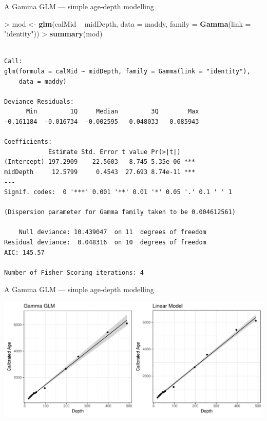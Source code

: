 \documentclass[10pt,ignorenonframetext,compress, aspectratio=169]{beamer}
\newenvironment{Shaded}{\begin{snugshade}}{\end{snugshade}}
\newcommand{\KeywordTok}[1]{\textcolor[rgb]{0.13,0.29,0.53}{\textbf{{#1}}}}
\newcommand{\DataTypeTok}[1]{\textcolor[rgb]{0.13,0.29,0.53}{{#1}}}
\newcommand{\StringTok}[1]{\textcolor[rgb]{0.31,0.60,0.02}{{#1}}}
\newcommand{\NormalTok}[1]{{#1}}
\begin{document}
\begin{frame}[fragile]{A Gamma GLM --- simple age-depth modelling}

\begin{Shaded}
\begin{Highlighting}[]
\NormalTok{>}\StringTok{ }\NormalTok{mod <-}\StringTok{ }\KeywordTok{glm}\NormalTok{(calMid ~}\StringTok{ }\NormalTok{midDepth, }\DataTypeTok{data =} \NormalTok{maddy, }\DataTypeTok{family =} \KeywordTok{Gamma}\NormalTok{(}\DataTypeTok{link =} \StringTok{"identity"}\NormalTok{))}
\NormalTok{>}\StringTok{ }\KeywordTok{summary}\NormalTok{(mod)}
\end{Highlighting}
\end{Shaded}

\begin{verbatim}

Call:
glm(formula = calMid ~ midDepth, family = Gamma(link = "identity"), 
    data = maddy)

Deviance Residuals: 
      Min         1Q     Median         3Q        Max  
-0.161184  -0.016734  -0.002595   0.048033   0.085943  

Coefficients:
            Estimate Std. Error t value Pr(>|t|)    
(Intercept) 197.2909    22.5603   8.745 5.35e-06 ***
midDepth     12.5799     0.4543  27.693 8.74e-11 ***
---
Signif. codes:  0 '***' 0.001 '**' 0.01 '*' 0.05 '.' 0.1 ' ' 1

(Dispersion parameter for Gamma family taken to be 0.004612561)

    Null deviance: 10.439047  on 11  degrees of freedom
Residual deviance:  0.048316  on 10  degrees of freedom
AIC: 145.57

Number of Fisher Scoring iterations: 4
\end{verbatim}

\end{frame}

\begin{frame}{A Gamma GLM --- simple age-depth modelling}

\begin{center}\includegraphics[width=0.9\linewidth]{01-glms_files/figure-beamer/plot-maddy-fitted-1} \end{center}

\end{frame}
\end{document}
